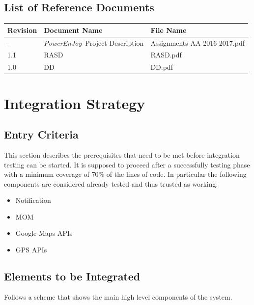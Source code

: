 \documentclass{article}
\newcommand{\pej}{\mbox{\normalfont\itshape PowerEnJoy }}
\begin{document}
		\subsection{List of Reference Documents}
			\begin{center}
				\renewcommand{\arraystretch}{1.4}
				\begin{tabular}{ | l | l | l |}
					\hline
					Revision & Document Name & File Name\\ \hline
					- & \pej Project Description & Assignments AA 2016-2017.pdf \\ \hline
					1.1 & RASD & RASD.pdf \\ \hline
					1.0 & DD & DD.pdf \\ \hline
				\end{tabular}
			\end{center}
			\pagebreak
	\section{Integration Strategy}
		\subsection{Entry Criteria}
		This section describes the prerequisites that need to be met before integration
		testing can be started. It is supposed to proceed after a successfully testing phase with a minimum coverage of 70\% of the lines of code.
		In particular the following components are considered already tested and thus trusted as working:
		\begin{itemize}
			\item Notification
			\item MOM
			\item Google Maps APIs
			\item GPS APIs
		\end{itemize}
		\subsection{Elements to be Integrated}
		Follows a scheme that shows the main high level components of the system.
		
\end{document}

